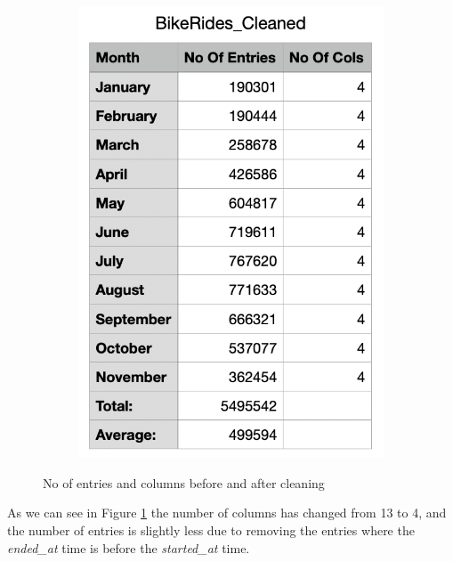 \documentclass[12pt]{article}
\begin{document}
\begin{itemize}
\begin{figure}[h]
\begin{subfigure}{.4\textwidth}
		\includegraphics[scale=0.5]{img4.png}
	\end{subfigure}
	\caption{No of entries and columns before and after cleaning}
	\label{fig5}
	\end{figure}
	
	As we can see in Figure \ref{fig5} the number of columns has changed from 13 to 4, and the number of entries is slightly less due to removing the entries where the \textit{ended\_at} time is before the \textit{started\_at} time. 
	
	\end{itemize}

\pagebreak
\end{document}
